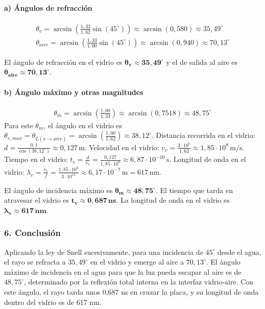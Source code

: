 \paragraph*{a) Ángulos de refracción}
\begin{gather}
    \theta_v = \arcsin\left(\frac{1,33}{1,62}\sin(45^\circ)\right) \approx \arcsin(0,580) \approx 35,49^\circ \\
    \theta_{aire} = \arcsin\left(\frac{1,33}{1,00}\sin(45^\circ)\right) \approx \arcsin(0,940) \approx 70,13^\circ
\end{gather}
\begin{cajaresultado}
    El ángulo de refracción en el vidrio es $\boldsymbol{\theta_v \approx 35,49^\circ}$ y el de salida al aire es $\boldsymbol{\theta_{aire} \approx 70,13^\circ}$.
\end{cajaresultado}

\paragraph*{b) Ángulo máximo y otras magnitudes}
\begin{gather}
    \theta_m = \arcsin\left(\frac{1,00}{1,33}\right) \approx \arcsin(0,7518) \approx 48,75^\circ
\end{gather}
Para este $\theta_m$, el ángulo en el vidrio es $\theta_{v,max} = \theta_{L(v \to aire)} = \arcsin\left(\frac{1,00}{1,62}\right) \approx 38,12^\circ$.
Distancia recorrida en el vidrio: $d = \frac{0,1}{\cos(38,12^\circ)} \approx 0,127 \, \text{m}$.
Velocidad en el vidrio: $v_v = \frac{3\cdot10^8}{1,62} \approx 1,85 \cdot 10^8 \, \text{m/s}$.
Tiempo en el vidrio: $t_v = \frac{d}{v_v} = \frac{0,127}{1,85 \cdot 10^8} \approx 6,87 \cdot 10^{-10} \, \text{s}$.
Longitud de onda en el vidrio: $\lambda_v = \frac{v_v}{f} = \frac{1,85 \cdot 10^8}{3 \cdot 10^{14}} \approx 6,17 \cdot 10^{-7} \, \text{m} = 617 \, \text{nm}$.

\begin{cajaresultado}
    El ángulo de incidencia máximo es $\boldsymbol{\theta_m \approx 48,75^\circ}$.
    El tiempo que tarda en atravesar el vidrio es $\boldsymbol{t_v \approx 0,687 \, \textbf{ns}}$.
    La longitud de onda en el vidrio es $\boldsymbol{\lambda_v \approx 617 \, \textbf{nm}}$.
\end{cajaresultado}

\subsubsection*{6. Conclusión}
\begin{cajaconclusion}
    Aplicando la ley de Snell sucesivamente, para una incidencia de $45^\circ$ desde el agua, el rayo se refracta a $35,49^\circ$ en el vidrio y emerge al aire a $70,13^\circ$. El ángulo máximo de incidencia en el agua para que la luz pueda escapar al aire es de $48,75^\circ$, determinado por la reflexión total interna en la interfaz vidrio-aire. Con este ángulo, el rayo tarda unos 0,687 ns en cruzar la placa, y su longitud de onda dentro del vidrio es de 617 nm.
\end{cajaconclusion}
\newpage


